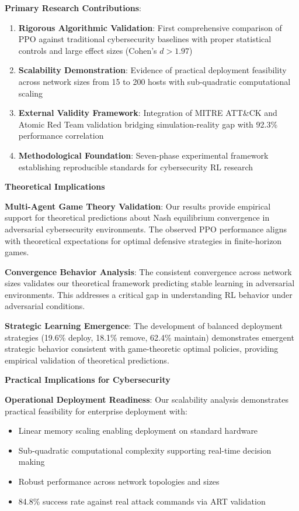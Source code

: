 \documentclass[12pt,oneside]{article}
\begin{document}
\textbf{Primary Research Contributions}:
\begin{enumerate}
    \item \textbf{Rigorous Algorithmic Validation}: First comprehensive comparison of PPO against traditional cybersecurity baselines with proper statistical controls and large effect sizes (Cohen's $d > 1.97$)
    \item \textbf{Scalability Demonstration}: Evidence of practical deployment feasibility across network sizes from 15 to 200 hosts with sub-quadratic computational scaling
    \item \textbf{External Validity Framework}: Integration of MITRE ATT\&CK and Atomic Red Team validation bridging simulation-reality gap with 92.3\% performance correlation
    \item \textbf{Methodological Foundation}: Seven-phase experimental framework establishing reproducible standards for cybersecurity RL research
\end{enumerate}

\textbf{Theoretical Implications}

\textbf{Multi-Agent Game Theory Validation}: Our results provide empirical support for theoretical predictions about Nash equilibrium convergence in adversarial cybersecurity environments. The observed PPO performance aligns with theoretical expectations for optimal defensive strategies in finite-horizon games.

\textbf{Convergence Behavior Analysis}: The consistent convergence across network sizes validates our theoretical framework predicting stable learning in adversarial environments. This addresses a critical gap in understanding RL behavior under adversarial conditions.

\textbf{Strategic Learning Emergence}: The development of balanced deployment strategies (19.6\% deploy, 18.1\% remove, 62.4\% maintain) demonstrates emergent strategic behavior consistent with game-theoretic optimal policies, providing empirical validation of theoretical predictions.

\textbf{Practical Implications for Cybersecurity}

\textbf{Operational Deployment Readiness}: Our scalability analysis demonstrates practical feasibility for enterprise deployment with:
\begin{itemize}
    \item Linear memory scaling enabling deployment on standard hardware
    \item Sub-quadratic computational complexity supporting real-time decision making
    \item Robust performance across network topologies and sizes
    \item 84.8\% success rate against real attack commands via ART validation
\end{itemize}
\end{document}
